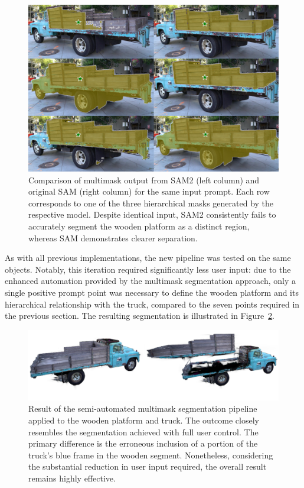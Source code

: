 \documentclass[12pt]{article}
\begin{document}
\begin{figure}[h!]
	\centering
	\includegraphics[width=\textwidth]{Images/sam1v2.png}
	\caption{Comparison of multimask output from SAM2 (left column) and original SAM (right column) for the same input prompt. Each row corresponds to one of the three hierarchical masks generated by the respective model. Despite identical input, SAM2 consistently fails to accurately segment the wooden platform as a distinct region, whereas SAM demonstrates clearer separation.
	}
	\label{fig:sam1better}
\end{figure}
\FloatBarrier
\noindent
As with all previous implementations, the new pipeline was tested on the same objects. Notably, this iteration required significantly less user input: due to the enhanced automation provided by the multimask segmentation approach, only a single positive prompt point was necessary to define the wooden platform and its hierarchical relationship with the truck, compared to the seven points required in the previous section. The resulting segmentation is illustrated in Figure~\ref{fig:multipair}.
\begin{figure}[h!]
	\centering
	\includegraphics[width=\textwidth]{Images/multipair.png}
	\caption{Result of the semi-automated multimask segmentation pipeline applied to the wooden platform and truck. The outcome closely resembles the segmentation achieved with full user control. The primary difference is the erroneous inclusion of a portion of the truck's blue frame in the wooden segment. Nonetheless, considering the substantial reduction in user input required, the overall result remains highly effective.
	}
	\label{fig:multipair}
\end{figure}
\end{document}
